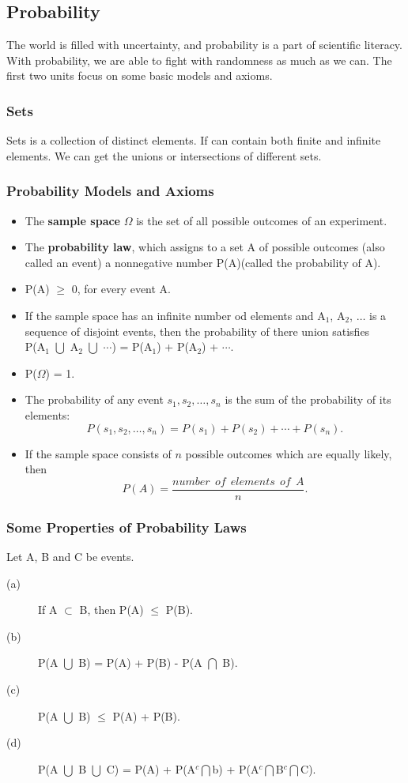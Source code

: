 \documentclass{article}
\begin{document}
 \subsection{Probability}

 The world is filled with uncertainty, and probability is a part of scientific literacy. With probability, we are able to fight with randomness as much as we can. The first two units focus on some basic models and  axioms.
 \subsubsection{Sets}

 Sets is a collection of distinct elements. If can contain both finite and infinite elements. We can get the unions or intersections of different sets.
 \subsubsection{Probability Models and Axioms}

 \begin{itemize}
 \item
 The \textbf{sample space} $\Omega$ is the set of all possible outcomes of an experiment.
 \item
 The \textbf{probability law}, which assigns to a set A of possible outcomes (also called an event) a nonnegative number P(A)(called the probability of A).
 \item
 P(A) $\geq$ 0, for every event A.
 \item
 If the sample space has an infinite number od elements and A$_{1}$, A$_{2}$, $\ldots$ is a sequence of disjoint events, then the probability of there union satisfies\\
 P(A$_{1}$ $\bigcup$ A$_{2}$ $\bigcup$ $\cdots$) = P(A$_{1}$) + P(A$_{2}$) + $\cdots$.
 \item
 P($\Omega$) = 1.
 \item
 The probability of any event ${s_1, s_2, \ldots, s_n}$ is the sum of the probability of its elements:\[P({s_1, s_2, \ldots, s_n}) = P(s_1) + P(s_2) + \cdots + P(s_n).\]
 \item
 If the sample space consists of $n$ possible outcomes which are equally likely, then\[P(A) = \frac{number \ \ of\ \ elements\ \ of\ \ A}{n}.\]
 \end{itemize}

 \subsubsection{Some Properties of Probability Laws}
 Let A, B and C be events.
 \begin{description}
 \item[(a)]
 If A $\subset$ B, then P(A) $\leq$ P(B).
 \item[(b)]
 P(A $\bigcup$ B) = P(A) + P(B) - P(A $\bigcap$ B).
 \item[(c)]
 P(A $\bigcup$ B) $\leq$ P(A) + P(B).
 \item[(d)]
 P(A $\bigcup$ B $\bigcup$ C) = P(A) + P(A$^{c}$$\bigcap$b) + P(A$^{c}$$\bigcap$B$^{c}$$\bigcap$C).
 \end{description}
\end{document}
